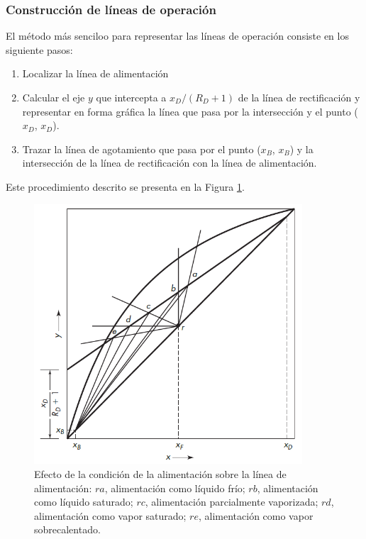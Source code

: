 \documentclass[11pt]{book}
\begin{document}
\subsubsection{Construcción de líneas de operación}

El método más senciloo para representar las líneas de operación consiste en los siguiente pasos:

\begin{enumerate}
    \item Localizar la línea de alimentación
    \item Calcular el eje $y$ que intercepta a $x_D/(R_D+1)$ de la línea de rectificación y representar en forma gráfica la línea que pasa por la intersección y el punto ($x_D$, $x_D$).
    \item Trazar la línea de agotamiento que pasa por el punto ($x_B$, $x_B$) y la intersección de la línea de rectificación con la línea de alimentación.
\end{enumerate}

Este procedimiento descrito se presenta en la Figura \ref{fig:LineasOperacion}.

\begin{figure}[H]
    \centering
    \includegraphics[width = 10cm]{img/destilacion/OperationLines.PNG}
    \caption{Efecto de la condición de la alimentación sobre la línea de alimentación: $ra$, alimentación como líquido frío; $rb$, alimentación como líquido saturado; $rc$, alimentación parcialmente vaporizada; $rd$, alimentación como vapor saturado; $re$, alimentación como vapor sobrecalentado.}
    \label{fig:LineasOperacion}
\end{figure}
\end{document}

